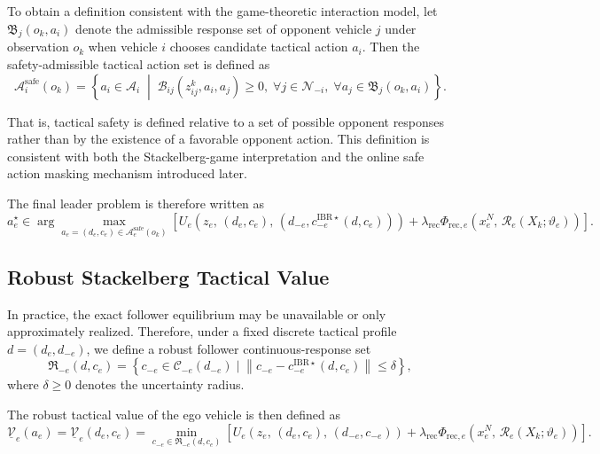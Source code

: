 \documentclass[final ,3p, times]{elsarticle}
\begin{document}
To obtain a definition consistent with the game-theoretic interaction model, let $\mathfrak{B}_j(o_k,a_i)$ denote the admissible response set of opponent vehicle $j$ under observation $o_k$ when vehicle $i$ chooses candidate tactical action $a_i$. Then the safety-admissible tactical action set is defined as
\begin{equation}
\mathcal{A}_i^{\mathrm{safe}}(o_k)
=
\left\{
a_i \in \mathcal{A}_i
\;\middle|\;
\mathcal{B}_{ij}(z_{ij}^k,a_i,a_j)\ge 0,\;
\forall j\in\mathcal{N}_{-i},\;
\forall a_j\in \mathfrak{B}_j(o_k,a_i)
\right\}.
\label{eq:safe_tactical_set}
\end{equation}

That is, tactical safety is defined relative to a set of possible opponent responses rather than by the existence of a favorable opponent action. This definition is consistent with both the Stackelberg-game interpretation and the online safe action masking mechanism introduced later.

The final leader problem is therefore written as
\begin{equation}
a_e^\star
\in
\arg\max_{a_e=(d_e,c_e)\in\mathcal{A}_e^{\mathrm{safe}}(o_k)}
\left[
U_e\!\left(
z_e,\,
(d_e,c_e),\,
(d_{-e},c_{-e}^{\mathrm{IBR}\star}(d,c_e))
\right)
+
\lambda_{\mathrm{rec}}
\Phi_{\mathrm{rec},e}
\left(
x_e^N,\,
\mathcal{R}_e(X_k;\vartheta_e)
\right)
\right].
\label{eq:final_safe_leader_problem}
\end{equation}



\subsection{Robust Stackelberg Tactical Value}
\label{subsec:robust_value}

In practice, the exact follower equilibrium may be unavailable or only approximately realized. Therefore, under a fixed discrete tactical profile $d=(d_e,d_{-e})$, we define a robust follower continuous-response set
\begin{equation}
\mathfrak{R}_{-e}(d,c_e)
=
\left\{
c_{-e}\in\mathcal{C}_{-e}(d_{-e})
\mid
\left\|c_{-e}-c_{-e}^{\mathrm{IBR}\star}(d,c_e)\right\|\le \delta
\right\},
\label{eq:robust_response_set}
\end{equation}
where $\delta \ge 0$ denotes the uncertainty radius.

The robust tactical value of the ego vehicle is then defined as
\begin{equation}
\underline{\mathcal{V}}_e(a_e)
=
\underline{\mathcal{V}}_e(d_e,c_e)
=
\min_{c_{-e}\in\mathfrak{R}_{-e}(d,c_e)}
\left[
U_e\!\left(
z_e,\,
(d_e,c_e),\,
(d_{-e},c_{-e})
\right)
+
\lambda_{\mathrm{rec}}
\Phi_{\mathrm{rec},e}
\left(
x_e^N,\,
\mathcal{R}_e(X_k;\vartheta_e)
\right)
\right].
\label{eq:robust_tactical_value}
\end{equation}
\end{document}
